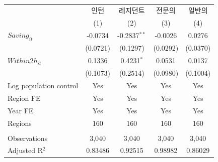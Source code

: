 \begingroup
\centering
\begin{tabular}{lcccc}
   \toprule
                          & 인턴     & 레지던트       & 전문의   & 일반의 \\   
                          & (1)      & (2)            & (3)      & (4)\\  
   \midrule 
   $Saving_{it}$          & -0.0734  & -0.2837$^{**}$ & -0.0026  & 0.0276\\   
                          & (0.0721) & (0.1297)       & (0.0292) & (0.0370)\\   
   $Within2h_{it}$        & 0.1336   & 0.4231$^{*}$   & 0.0531   & 0.0137\\   
                          & (0.1073) & (0.2514)       & (0.0980) & (0.1004)\\   
   Log population control & Yes      & Yes            & Yes      & Yes\\  
   Region FE              & Yes      & Yes            & Yes      & Yes\\  
   Year FE                & Yes      & Yes            & Yes      & Yes\\  
   Regions                & 160      & 160            & 160      & 160\\  
    \\
   Observations           & 3,040    & 3,040          & 3,040    & 3,040\\  
   Adjusted R$^2$         & 0.83486  & 0.92515        & 0.98982  & 0.86029\\  
   \bottomrule
\end{tabular}
\par\endgroup
